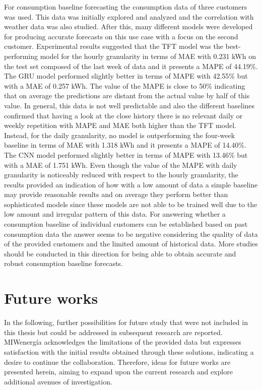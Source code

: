 For consumption baseline forecasting the consumption data of three customers was used.
This data was initially explored and analyzed and the correlation with weather data was also studied.
After this, many different models were developed for producing accurate forecasts on this use case with a focus on the second customer.
Experimental results suggested that the TFT model was the best-performing model for the hourly granularity in terms of MAE with 0.231 kWh on the test set composed of the last week of data and it presents a MAPE of 44.19\%.
The GRU model performed slightly better in terms of MAPE with 42.55\% but with a MAE of 0.257 kWh.
The value of the MAPE is close to 50\% indicating that on average the predictions are distant from the actual value by half of this value.
In general, this data is not well predictable and also the different baselines confirmed that having a look at the close history there is no relevant daily or weekly repetition with MAPE and MAE both higher than the TFT model.
Instead, for the daily granularity, no model is outperforming the four-week baseline in terms of MAE with 1.318 kWh and it presents a MAPE of 14.40\%.
The CNN model performed slightly better in terms of MAPE with 13.46\% but with a MAE of 1.751 kWh.
Even though the value of the MAPE with daily granularity is noticeably reduced with respect to the hourly granularity, the results provided an indication of how with a low amount of data a simple baseline may provide reasonable results and on average they perform better than sophisticated models since these models are not able to be trained well due to the low amount and irregular pattern of this data.
For answering whether a consumption baseline of individual customers can be established based on past consumption data the answer seems to be negative considering the quality of data of the provided customers and the limited amount of historical data.
More studies should be conducted in this direction for being able to obtain accurate and robust consumption baseline forecasts.


\section{Future works}
\label{sec:future}
\vspace{0.2 cm}

In the following, further possibilities for future study that were not included in this thesis but could be addressed in subsequent research are reported.
MIWenergía acknowledges the limitations of the provided data but expresses satisfaction with the initial results obtained through these solutions, indicating a desire to continue the collaboration.
Therefore, ideas for future works are presented herein, aiming to expand upon the current research and explore additional avenues of investigation.

